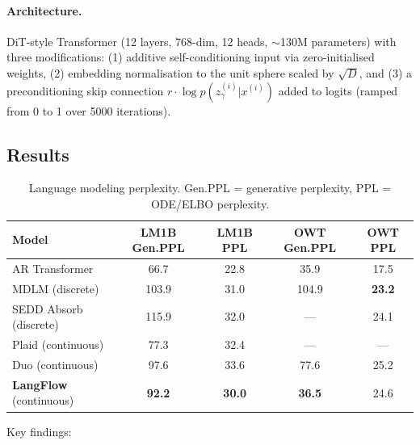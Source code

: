\documentclass[11pt]{article}
\begin{document}
\paragraph{Architecture.}
DiT-style Transformer (12 layers, 768-dim, 12 heads, $\sim$130M parameters) with three modifications: (1) additive self-conditioning input via zero-initialised weights, (2) embedding normalisation to the unit sphere scaled by $\sqrt{D}$, and (3) a preconditioning skip connection $r \cdot \log p(z_\gamma^{(i)} | x^{(i)})$ added to logits (ramped from 0 to 1 over 5000 iterations).

\subsection{Results}

\begin{table}[h]
\centering
\caption{Language modeling perplexity. Gen.PPL = generative perplexity, PPL = ODE/ELBO perplexity.}
\begin{tabular}{lcccc}
\toprule
\textbf{Model} & \textbf{LM1B Gen.PPL} & \textbf{LM1B PPL} & \textbf{OWT Gen.PPL} & \textbf{OWT PPL} \\
\midrule
AR Transformer & 66.7 & 22.8 & 35.9 & 17.5 \\
\midrule
MDLM (discrete) & 103.9 & 31.0 & 104.9 & \textbf{23.2} \\
SEDD Absorb (discrete) & 115.9 & 32.0 & --- & 24.1 \\
Plaid (continuous) & 77.3 & 32.4 & --- & --- \\
Duo (continuous) & 97.6 & 33.6 & 77.6 & 25.2 \\
\textbf{LangFlow} (continuous) & \textbf{92.2} & \textbf{30.0} & \textbf{36.5} & 24.6 \\
\bottomrule
\end{tabular}
\end{table}

Key findings:
\end{document}
